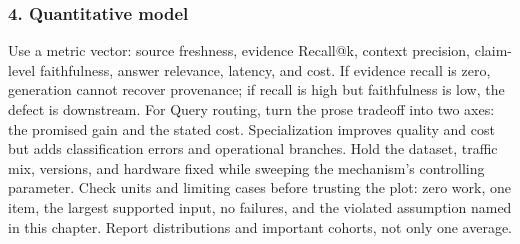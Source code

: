 \subsubsection*{4. Quantitative model}
Use a metric vector: source freshness, evidence Recall@k, context precision, claim-level faithfulness, answer relevance, latency, and cost. If evidence recall is zero, generation cannot recover provenance; if recall is high but faithfulness is low, the defect is downstream.
For Query routing, turn the prose tradeoff into two axes: the promised gain and the stated cost. Specialization improves quality and cost but adds classification errors and operational branches. Hold the dataset, traffic mix, versions, and hardware fixed while sweeping the mechanism's controlling parameter.
Check units and limiting cases before trusting the plot: zero work, one item, the largest supported input, no failures, and the violated assumption named in this chapter. Report distributions and important cohorts, not only one average.
